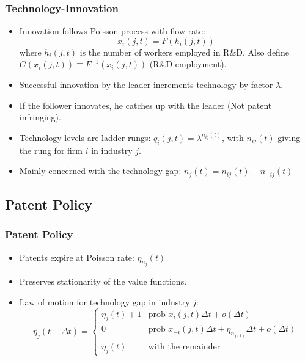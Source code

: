 \documentclass{beamer}
\begin{document}
\begin{frame}[t]\frametitle{Technology-Innovation} 
  \begin{itemize}
    \item<+-> Innovation follows Poisson process with flow rate:
      \begin{equation} \label{eq:tech_rd_technology}
        x_i(j, t) = F(h_i(j, t))
      \end{equation}
      where $h_i(j, t)$ is the number of workers employed in R\&D.
      Also define $G(x_i(j,t)) \equiv F^{-1}(x_i(j,t))$ (R\&D employment).
    \item<+-> Successful innovation by the leader increments technology by factor $\lambda$.
    \item<+-> If the follower innovates, he catches up with the leader (Not patent infringing).
    \item<+-> Technology levels are ladder rungs: $q_i(j, t) = \lambda^{n_{ij}(t)}$, with $n_{ij}(t)$ giving the rung for firm $i$ in industry $j$.
    \item<+-> Mainly concerned with the technology gap: $n_j(t) = n_{ij}(t) - n_{-ij}(t)$
  \end{itemize}
\end{frame}

\subsection{Patent Policy}
\label{sub:patent_policy}

\begin{frame}[t]\frametitle{Patent Policy}
  \begin{itemize}
    \item<+-> Patents expire at Poisson rate: $\eta_{n_j}(t)$
    \item<+-> Preserves stationarity of the value functions.
    \item<+-> Law of motion for technology gap in industry $j$:
      \begin{equation*} \label{eq:tech_law_of_motion}
        \eta_j(t + \Delta t) =
        \begin{cases}
          \eta_j(t) + 1 & \textrm{prob } x_i(j,t)\Delta t + o(\Delta t)\\
          0 & \textrm{prob } x_{-i}(j,t)\Delta t + \eta_{n_{j(t)}}\Delta t + o(\Delta t) \\
          \eta_j(t) & \textrm{with the remainder} 
        \end{cases}
      \end{equation*}
  \end{itemize}
\end{frame}
\end{document}
